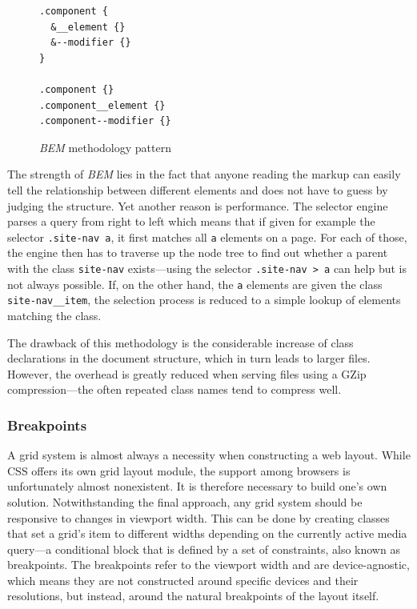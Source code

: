 \documentclass[thesis=M,english,hidelinks]{FITthesis}[2012/10/20]
\newcommand{\code}{\texttt}
\begin{document}
\begin{figure}[h]
  \begin{lstlisting}
.component {
  &__element {}
  &--modifier {}
}

.component {}
.component__element {}
.component--modifier {}
  \end{lstlisting}
  \caption{\textit{BEM} methodology pattern}
  \label{fig:bem_pattern}
\end{figure}

The strength of \textit{BEM} lies in the fact that anyone reading the markup can easily tell the relationship between different elements and does not have to guess by judging the structure. Yet another reason is performance. The selector engine parses a query from right to left which means that if given for example the selector \code{.site-nav a}, it first matches all \code{a} elements on a page. For each of those, the engine then has to traverse up the node tree to find out whether a parent with the class \code{site-nav} exists---using the selector \code{.site-nav > a} can help but is not always possible. If, on the other hand, the \code{a} elements are given the class \code{site-nav\_\_item}, the selection process is reduced to a simple lookup of elements matching the class.

The drawback of this methodology is the considerable increase of class declarations in the document structure, which in turn leads to larger files. However, the overhead is greatly reduced when serving files using a GZip compression---the often repeated class names tend to compress well.

    \subsubsection{Breakpoints}

A grid system is almost always a necessity when constructing a web layout. While CSS offers its own grid layout module, the support among browsers is unfortunately almost nonexistent. It is therefore necessary to build one's own solution. Notwithstanding the final approach, any grid system should be responsive to changes in viewport width. This can be done by creating classes that set a grid's item to different widths depending on the currently active media query---a conditional block that is defined by a set of constraints, also known as breakpoints. The breakpoints refer to the viewport width and are device-agnostic, which means they are not constructed around specific devices and their resolutions, but instead, around the natural breakpoints of the layout itself.
\end{document}
